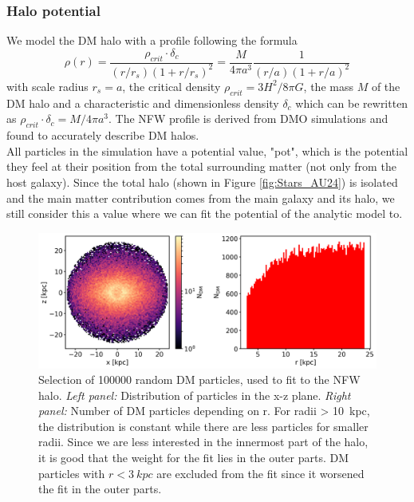 \subsubsection{Halo potential}\label{subsubsec:halo_pot}
We model the \ac{DM} halo with a  \citep{NFWprofile} profile following the formula 
\begin{equation}
    \rho(r) = \frac{\rho_{crit} \cdot \delta_c}{(r/r_s)(1+r/r_s)^2} = \frac{M}{4 \pi a^3}\frac{1}{(r/a)(1+r/a)^2}
\end{equation} with scale radius $r_s = a$, the critical density $\rho_{crit} = 3H^2 / 8\pi G $, the mass $M$ of the \ac{DM} halo and a characteristic and dimensionless density $\delta_c$ which can be rewritten as \(\rho_{crit}\cdot\delta_c = M/4\pi a^3 \). The \ac{NFW} profile is derived from \ac{DMO} simulations and found to accurately describe \ac{DM} halos. 
\\All particles in the simulation have a potential value, "pot",  which is the potential they feel at their position from the total surrounding matter (not only from the host galaxy). Since the total halo (shown in Figure \ref{fig:Stars_AU24}) is isolated and the main matter contribution comes from the main galaxy and its halo, we still consider this a value where we can fit the potential of the analytic model to. 
\begin{figure}[htbp]
\captionsetup{format=plain}
    \centering
    \includegraphics[width=\textwidth]{plots/Auriga/DM_selected_part_dist_snap_127.png}
    \caption{Selection of 100000 random \ac{DM} particles, used to fit to the \ac{NFW} halo. \textit{Left panel:} Distribution of particles in the x-z plane. \textit{Right panel:} Number of \ac{DM} particles depending on r. For radii > \SI{10}{kpc}, the distribution is constant while there are less particles for smaller radii. Since we are less interested in the innermost part of the halo, it is good that the weight for the fit lies in the outer parts. \ac{DM} particles with $r < \SI{3}{kpc}$ are excluded from the fit since it worsened the fit in the outer parts.}
    \label{fig:DM_part_selection}
\end{figure}
